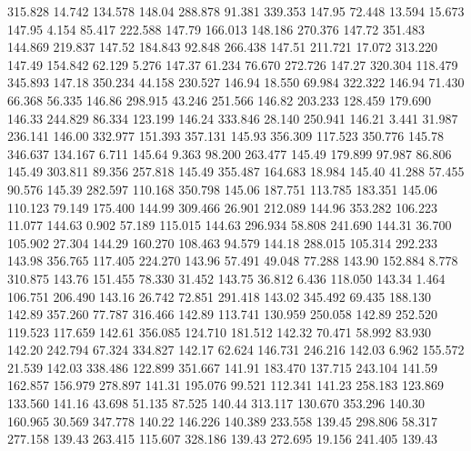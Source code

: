  315.828   14.742  134.578       148.04
 288.878   91.381  339.353       147.95
  72.448   13.594   15.673       147.95
   4.154   85.417  222.588       147.79
 166.013  148.186  270.376       147.72
 351.483  144.869  219.837       147.52
 184.843   92.848  266.438       147.51
 211.721   17.072  313.220       147.49
 154.842   62.129    5.276       147.37
  61.234   76.670  272.726       147.27
 320.304  118.479  345.893       147.18
 350.234   44.158  230.527       146.94
  18.550   69.984  322.322       146.94
  71.430   66.368   56.335       146.86
 298.915   43.246  251.566       146.82
 203.233  128.459  179.690       146.33
 244.829   86.334  123.199       146.24
 333.846   28.140  250.941       146.21
   3.441   31.987  236.141       146.00
 332.977  151.393  357.131       145.93
 356.309  117.523  350.776       145.78
 346.637  134.167    6.711       145.64
   9.363   98.200  263.477       145.49
 179.899   97.987   86.806       145.49
 303.811   89.356  257.818       145.49
 355.487  164.683   18.984       145.40
  41.288   57.455   90.576       145.39
 282.597  110.168  350.798       145.06
 187.751  113.785  183.351       145.06
 110.123   79.149  175.400       144.99
 309.466   26.901  212.089       144.96
 353.282  106.223   11.077       144.63
   0.902   57.189  115.015       144.63
 296.934   58.808  241.690       144.31
  36.700  105.902   27.304       144.29
 160.270  108.463   94.579       144.18
 288.015  105.314  292.233       143.98
 356.765  117.405  224.270       143.96
  57.491   49.048   77.288       143.90
 152.884    8.778  310.875       143.76
 151.455   78.330   31.452       143.75
  36.812    6.436  118.050       143.34
   1.464  106.751  206.490       143.16
  26.742   72.851  291.418       143.02
 345.492   69.435  188.130       142.89
 357.260   77.787  316.466       142.89
 113.741  130.959  250.058       142.89
 252.520  119.523  117.659       142.61
 356.085  124.710  181.512       142.32
  70.471   58.992   83.930       142.20
 242.794   67.324  334.827       142.17
  62.624  146.731  246.216       142.03
   6.962  155.572   21.539       142.03
 338.486  122.899  351.667       141.91
 183.470  137.715  243.104       141.59
 162.857  156.979  278.897       141.31
 195.076   99.521  112.341       141.23
 258.183  123.869  133.560       141.16
  43.698   51.135   87.525       140.44
 313.117  130.670  353.296       140.30
 160.965   30.569  347.778       140.22
 146.226  140.389  233.558       139.45
 298.806   58.317  277.158       139.43
 263.415  115.607  328.186       139.43
 272.695   19.156  241.405       139.43
